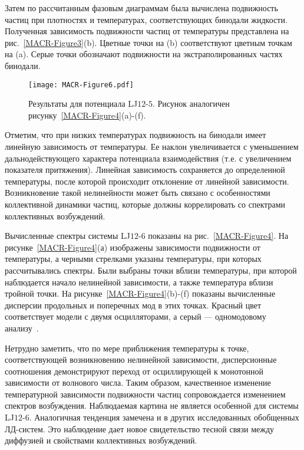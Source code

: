 Затем по рассчитанным фазовым диаграммам была вычислена подвижность частиц при плотностях и температурах, соответствующих бинодали жидкости.
Полученная зависимость подвижности частиц от температуры представлена на рис.~\ref{MACR-Figure3}(b).
Цветные точки на (b) соответствуют цветным точкам на (a).
Серые точки обозначают подвижности на экстраполированных частях бинодали.

\begin{figure}[!t]
  \centering
  \texttt{[image: MACR-Figure6.pdf]}
  \caption{Результаты для потенциала LJ$12$-$5$.
    Рисунок аналогичен рисунку~\ref{MACR-Figure4}(a)-(f).}
  \label{MACR-Figure6}
\end{figure}

Отметим, что при низких температурах подвижность на бинодали имеет линейную зависимость от температуры.
Ее наклон увеличивается с уменьшением дальнодействующего характера потенциала взаимодействия (т.е. с увеличением показателя притяжения).
Линейная зависимость сохраняется до определенной температуры, после которой происходит отклонение от линейной зависимости.
Возникновение такой нелинейности может быть связано с особенностями коллективной динамики частиц, которые должны коррелировать со спектрами коллективных возбуждений.

Вычисленные спектры системы LJ$12$-$6$ показаны на рис.~\ref{MACR-Figure4}.
На рисунке~\ref{MACR-Figure4}(а) изображены зависимости подвижности от температуры, а черными стрелками указаны температуры, при которых рассчитывались спектры. 
Были выбраны точки вблизи температуры, при которой наблюдается начало нелинейной зависимости, а также температура вблизи тройной точки.
На рисунке~\ref{MACR-Figure4}(b)-(f) показаны вычисленные дисперсии продольных и поперечных мод в этих точках.
Красный цвет соответствует модели с двумя осцилляторами, а серый — одномодовому анализу~\cite{10.1038/s41598-019-46979-y}.

Нетрудно заметить, что по мере приближения температуры к точке, соответствующей возникновению нелинейной зависимости, дисперсионные соотношения демонстрируют переход от осциллирующей к монотонной зависимости от волнового числа.
Таким образом, качественное изменение температурной зависимости подвижности частиц сопровождается изменением спектров возбуждения.
Наблюдаемая картина не является особенной для системы LJ$12$-$6$.
Аналогичная тенденция замечена и в других исследованных обобщенных ЛД-систем.
Это наблюдение дает новое свидетельство тесной связи между диффузией и свойствами коллективных возбуждений.


